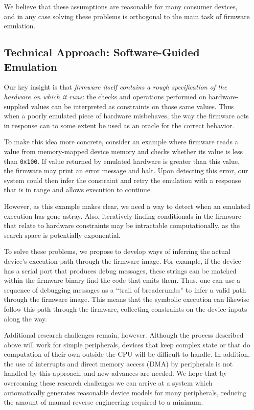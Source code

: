 We believe that these assumptions are reasonable for many consumer
devices, and in any case solving these problems is orthogonal to the
main task of firmware emulation.

\subsection{Technical Approach: Software-Guided Emulation}

Our key insight is that \emph{firmware itself contains a rough
specification of the hardware on which it runs}: the checks and
operations performed on hardware-supplied values can be interpreted as
constraints on those same values. Thus when a poorly emulated piece of
hardware misbehaves, the way the firmware acts in response can to
some extent be used as an oracle for the correct behavior.

To make this idea more concrete, consider an example where firmware
reads a value from memory-mapped device memory and checks whether its
value is less than \texttt{0x100}. If value returned by emulated
hardware is greater than this value, the firmware may print an error
message and halt. Upon detecting this error, our system could then infer
the constraint and retry the emulation with a response that is in range
and allows execution to continue.

However, as this example makes clear, we need a way to detect when an
emulated execution has gone astray. Also, iteratively finding
conditionals in the firmware that relate to hardware constraints may be
intractable computationally, as the search space is potentially
exponential.

To solve these problems, we propose to develop ways of inferring the
actual device's execution path through the firmware image. For example,
if the device has a serial port that produces debug messages, these
strings can be matched within the firmware binary find the code that
emits them. Thus, one can use a sequence of debugging messages as a
``trail of breadcrumbs'' to infer a valid path through the firmware
image. This means that the symbolic execution can likewise follow this
path through the firmware, collecting constraints on the device inputs
along the way.

Additional research challenges remain, however. Although the process
described above will work for simple peripherals, devices that keep
complex state or that do computation of their own outside the CPU will
be difficult to handle. In addition, the use of interrupts and direct
memory access (DMA) by peripherals is not handled by this approach, and
new advances are needed. We hope that by overcoming these research
challenges we can arrive at a system which automatically generates
reasonable device models for many peripherals, reducing the amount of
manual reverse engineering required to a minimum.


